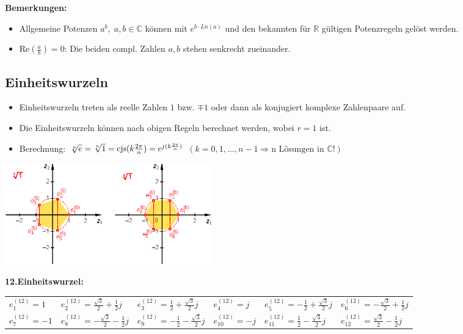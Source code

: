 		\textbf{Bemerkungen:}
		\begin{itemize}
		    \item Allgemeine Potenzen $a^b,\;a,b \in \mathbb{C}$ können mit $e^{b \cdot 
		    	Ln(a)}$ und den bekannten für $\mathbb{R}$ gültigen Potenzregeln gelöst
		    	werden.
		    \item Re$\left (\frac{a}{b} \right) = 0$: Die beiden compl. Zahlen $a, b$
		    	stehen senkrecht zueinander.
		\end{itemize}


	\subsection{Einheitswurzeln}
		\begin{minipage}[c]{9 cm}
			\begin{itemize}
			  \item Einheitswurzeln treten als reelle Zahlen $1$ bzw. $\mp 1$ oder dann als
			  konjugiert komplexe Zahlenpaare auf.
			  \item Die Einheitswurzeln können nach obigen Regeln berechnet werden, wobei $r
			  = 1$ ist. 
			  \item Berechnung: 
			  		$ \sqrt[n]{e} = \sqrt[n]{1} = \operatorname{cjs}(k \frac{2\pi}{n}) 
					  = e^{j(k \frac{2\pi}{n})} $  \newline
					$  (k = 0, 1, \ldots, n-1 \Rightarrow \text{n Lösungen in } \mathbb{C} !)$
			\end{itemize} 
		\end{minipage}
		\hspace*{0.5cm}						
		\begin{minipage}[c]{8 cm}
				\includegraphics[width=9cm]{./bilder/einheitswurzel.png}
		\end{minipage}
		
		\textbf{12.Einheitswurzel:} \\
		\begin{tabular}{llllll}
			$e^{(12)}_1 = 1$ & $e^{(12)}_2 = \frac{\sqrt3}{2} + \frac12j$ & $e^{(12)}_3 =
			\frac12 + \frac{\sqrt3}{2}j$ & $e^{(12)}_4 = j$ & $e^{(12)}_5 = -\frac12 +
			\frac{\sqrt3}{2}j$ & $e^{(12)}_6 = -\frac{\sqrt3}{2} + \frac12 j$ \\
			$e^{(12)}_7 = -1$ & $e^{(12)}_8 = -\frac{\sqrt3}{2} - \frac12 j$ &
			$e^{(12)}_9 = -\frac12 - \frac{\sqrt3}{2}j$ & $e^{(12)}_{10} = -j$ &
			$e^{(12)}_{11} = \frac12 - \frac{\sqrt3}{2}j$ & $e^{(12)}_{12} =
			\frac{\sqrt3}{2} - \frac12j$ \\
		\end{tabular}
		
